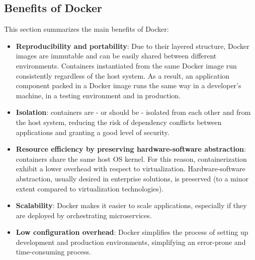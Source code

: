 \subsection{Benefits of Docker}
This section summarizes the main benefits of Docker:
\begin{itemize}
    \item \textbf{Reproducibility and portability}: Due to their layered structure, Docker images are immutable and can be easily shared between different environments. Containers instantiated from the same Docker image run consistently regardless of the host system. 
    As a result, an application component packed in a Docker image runs the same way in a developer's machine, in a testing environment and in production.
    \item \textbf{Isolation}: containers are - or should be - isolated from each other and from the host system, reducing the risk of dependency conflicts between applications and granting a good level of security.
    \item \textbf{Resource efficiency by preserving hardware-software abstraction}: containers share the same host OS kernel. For this reason, containerization exhibit a lower overhead with respect to virtualization. Hardware-software abstraction, usually desired in enterprise solutions, is preserved (to a minor extent compared to virtualization technologies).
    \item \textbf{Scalability}: Docker makes it easier to scale applications, especially if they are deployed by orchestrating microservices. 
    \item \textbf{Low configuration overhead}: Docker simplifies the process of setting up development and production environments, simplifying an error-prone and time-consuming process.
\end{itemize}












